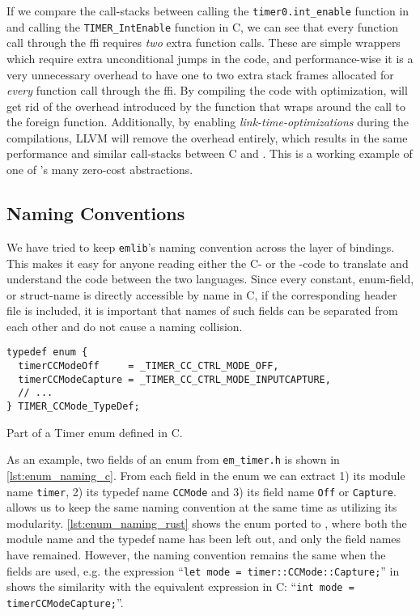 If we compare the call-stacks between calling the \texttt{timer0.int\_enable} function in \rust and calling the \texttt{TIMER\_IntEnable} function in C, we can see that every function call through the \gls{ffi} requires \emph{two} extra function calls.
These are simple wrappers which require extra unconditional jumps in the code, and performance-wise it is a very unnecessary overhead to have one to two extra stack frames allocated for \emph{every} function call through the \gls{ffi}.
By compiling the code with optimization, \rust will get rid of the overhead introduced by the function that wraps around the call to the foreign function.
Additionally, by enabling \emph{link-time-optimizations} during the compilations, LLVM will remove the overhead entirely, which results in the same performance and similar call-stacks between C and \rust.
This is a working example of one of \rust's many zero-cost abstractions.

\subsection{Naming Conventions}

We have tried to keep \texttt{emlib}'s naming convention across the layer of bindings.
This makes it easy for anyone reading either the C- or the \rust-code to translate and understand the code between the two languages.
Since every constant, enum-field, or struct-name is directly accessible by name in C, if the corresponding header file is included, it is important that names of such fields can be separated from each other and do not cause a naming collision.

\begin{listing}[h]
\begin{verbatim}
typedef enum {
  timerCCModeOff     = _TIMER_CC_CTRL_MODE_OFF,
  timerCCModeCapture = _TIMER_CC_CTRL_MODE_INPUTCAPTURE,
  // ...
} TIMER_CCMode_TypeDef;
\end{verbatim}
\caption{Part of a Timer enum defined in C.}
\label{lst:enum_naming_c}
\end{listing}

As an example, two fields of an enum from \texttt{em\_timer.h} is shown in \autoref{lst:enum_naming_c}.
From each field in the enum we can extract 1) its module name \texttt{timer}, 2) its typedef name \texttt{CCMode} and 3) its field name \texttt{Off} or \texttt{Capture}.
\rust allows us to keep the same naming convention at the same time as utilizing its modularity.
\autoref{lst:enum_naming_rust} shows the enum ported to \rust, where both the module name and the typedef name has been left out, and only the field names have remained.
However, the naming convention remains the same when the fields are used, e.g. the expression ``\texttt{let mode = timer::CCMode::Capture;}'' in \rust shows the similarity with the equivalent expression in C: ``\texttt{int mode = timerCCModeCapture;}''.

